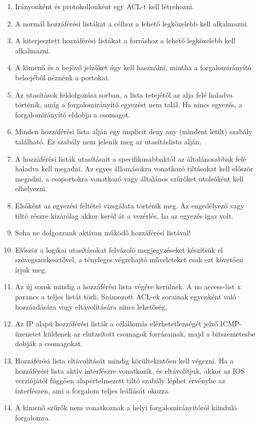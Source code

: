 \begin{enumerate}[nosep]
	\item Irányonként és protokollonként egy ACL-t kell létrehozni.
	\item A normál hozzáférési listákat a célhoz a lehető legközelebb kell alkalmazni.
	\item A kiterjesztett hozzáférési listákat a forráshoz a lehető legközelebb kell alkalmazni.
	\item A kimenő és a bejövő jelzőket úgy kell használni, mintha a forgalomirányító belsejéből néznénk a portokat.
	\item Az utasítások feldolgozása sorban, a lista tetejétől az alja felé haladva történik, amíg a forgalomirányító egyezést nem talál. Ha nincs egyezés, a forgalomirányító eldobja a csomagot.
	\item Minden hozzáférési lista alján egy implicit deny any (mindent letilt) szabály található. Ez szabály nem jelenik meg az utasításlista alján.
	\item A hozzáférési listák utasításait a specifikusabbaktól az általánosabbak felé haladva kell megadni. Az egyes állomásokra vonatkozó tiltásokat kell először megadni, a csoportokra vonatkozó vagy általános szűrőket utolsóként kell elhelyezni.
	\item Elsőként az egyezési feltétel vizsgálata történik meg. Az engedélyező vagy tiltó részre kizárólag akkor kerül át a vezérlés, ha az egyezés igaz volt.
	\item Soha ne dolgozzunk aktívan működő hozzáférési listával!
	\item Először a logikai utasításokat felvázoló megjegyzéseket készítsük el szövegszerkesztővel, a tényleges végrehajtó műveleteket csak ezt követően írjuk meg.
	\item Az új sorok mindig a hozzáférési lista végére kerülnek. A no access-list x parancs a teljes listát törli. Számozott ACL-ek sorainak egyenként való hozzáadására vagy eltávolítására nincs lehetőség.
	\item Az IP alapú hozzáférési listák a célállomás elérhetetlenségét jelző ICMP-üzenetet küldenek az elutasított csomagok forrásainak, majd a bitszemetesbe dobják a csomagokat.
	\item Hozzáférési lista eltávolítását mindig körültekintően kell végezni. Ha a hozzáférési lista aktív interfészre vonatkozik, és eltávolítjuk, akkor az IOS verziójától függően alapértelmezett tiltó szabály léphet érvénybe az interfészen, ami a forgalom teljes leállását okozza.
	\item A kimenő szűrők nem vonatkoznak a helyi forgalomirányítóról kiinduló forgalomra.
\end{enumerate}

